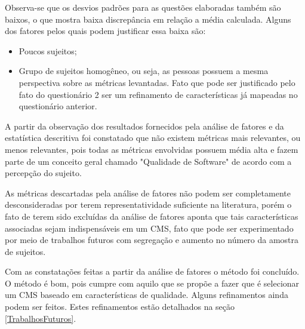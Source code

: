 Observa-se que os desvios padrões para as questões elaboradas também são baixos, o que mostra baixa discrepância em relação a média calculada. Alguns dos fatores pelos quais podem justificar essa baixa são:

\begin{itemize}

\item Poucos sujeitos;
\item Grupo de sujeitos homogêneo, ou seja, as pessoas possuem a mesma perspectiva sobre as métricas levantadas. Fato que pode ser justificado pelo fato do questionário 2 ser um refinamento de características já mapeadas no questionário anterior.

\end{itemize}

A partir da observação dos resultados fornecidos pela análise de fatores e da estatística descritiva foi constatado que não existem métricas mais relevantes, ou menos relevantes, pois todas as métricas envolvidas possuem média alta e fazem parte de um conceito geral chamado "Qualidade de Software" de acordo com a percepção do sujeito. 

As métricas descartadas pela análise de fatores não podem ser completamente desconsideradas por terem representatividade suficiente na literatura, porém o fato de terem sido excluídas da análise de fatores aponta que tais características associadas sejam indispensáveis em um CMS, fato que pode ser experimentado por meio de trabalhos futuros com segregação e aumento no número da amostra de sujeitos.

Com as constatações feitas a partir da análise de fatores o método foi concluído. O método é bom, pois cumpre com aquilo que se propõe a fazer que é selecionar um CMS baseado em características de qualidade. Alguns refinamentos ainda podem ser feitos. Estes refinamentos estão detalhados na seção \ref{TrabalhosFuturos}.








